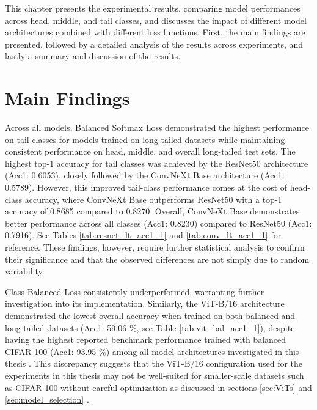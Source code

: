 \label{chap:results}
This chapter presents the experimental results, comparing model performances across head, middle, and tail classes, and discusses the impact of different model architectures combined with different loss functions. First, the main findings are presented, followed by a detailed analysis of the results across experiments, and lastly a summary and discussion of the results. 


\section{Main Findings}
Across all models, Balanced Softmax Loss demonstrated the highest performance on tail classes for models trained on long-tailed datasets while maintaining consistent performance on head, middle, and overall long-tailed test sets. The highest top-1 accuracy for tail classes was achieved by the ResNet50 architecture (Acc1: 0.6053), closely followed by the ConvNeXt Base architecture (Acc1: 0.5789). However, this improved tail-class performance comes at the cost of head-class accuracy, where ConvNeXt Base outperforms ResNet50 with a top-1 accuracy of 0.8685 compared to 0.8270. Overall, ConvNeXt Base demonstrates better performance across all classes (Acc1: 0.8230) compared to ResNet50 (Acc1: 0.7916). See Tables \ref{tab:resnet_lt_acc1_1} and \ref{tab:conv_lt_acc1_1} for reference. These findings, however, require further statistical analysis to confirm their significance and that the observed differences are not simply due to random variability.

Class-Balanced Loss consistently underperformed, warranting further investigation into its implementation. Similarly, the ViT-B/16 architecture demonstrated the lowest overall accuracy when trained on both balanced and long-tailed datasets (Acc1: 59.06 \%, see Table \ref{tab:vit_bal_acc1_1}), despite having the highest reported benchmark performance trained with balanced CIFAR-100 (Acc1: 93.95 \%) among all model architectures investigated in this thesis \cite{Tseng_2022}. This discrepancy suggests that the ViT-B/16 configuration used for the experiments in this thesis may not be well-suited for smaller-scale datasets such as CIFAR-100 without careful optimization as discussed in sections \ref{sec:ViTs} and \ref{sec:model_selection} .

